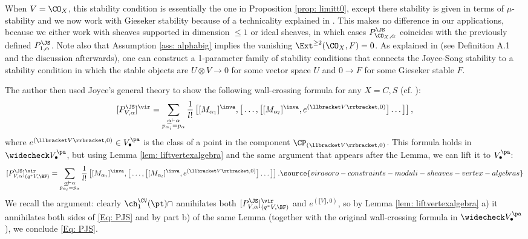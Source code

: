 When $V=\CO_X$, this stability condition is essentially the one in Proposition \ref{prop: limitt0}, except there stability is given in terms of $\mu$-stability and we now work with Gieseker stability because of a technicality explained in \cite[Rem. A.3]{Bo21.5}. This makes no difference in our applications, because we either work with sheaves supported in dimension $\leq 1$ or ideal sheaves, in which cases $P^{\JS}_{\CO_X, \alpha}$ coincides with the previously defined $P^{\JS}_{1,\alpha}$. Note also that Assumption \ref{ass: alphabig} implies the vanishing $\Ext^{\geq 2}(\CO_X,F)=0$. As explained in \cite{Bo21.5} (see Definition A.1 and the discussion afterwards), one can construct a 1-parameter family of stability conditions that connects the Joyce-Song stability to a stability condition in which the stable objects are $U\otimes V\to 0$ for some vector space $U$ and $0\to F$ for some Gieseker stable $F$.

The author then used Joyce's general theory to show the following wall-crossing formula for any $X=C,S$ (cf.  \cite[Theorem A.4]{Bo21.5}):
 $$[P^{\JS}_{V,\alpha}]^\vir= \sum_{\substack{\underline{\alpha} \vdash \alpha\\ p_{\alpha_i}=p_{\alpha}}}\frac{1}{l!}\, \big[[M_{\alpha_1}]^\inva, \big[\ldots, \big[[M_{\alpha_l}]^\inva, e^{(\llbracket V\rrbracket,0)}\big]\ldots\big]\big]\,,$$
 where $e^{(\llbracket V\rrbracket,0)}\in V_\bullet^{\pa}$ is the class of a point in the component $\CP_{(\llbracket V\rrbracket ,0)}$. This formula holds in $\widecheck V_\bullet^{\pa}$, but using Lemma \ref{lem: liftvertexalgebra} and the same argument that appears after the Lemma, we can lift it to $V_\bullet^{\pa}$:
\begin{equation}
\label{Eq: PJS} [P^{\JS}_{V,\alpha}]^\vir_{(q^*V,\BF)}= \sum_{\substack{\underline{\alpha} \vdash \alpha\\ p_{\alpha_i}=p_{\alpha}}}\frac{1}{l!}\, \big[[M_{\alpha_1}]^\inva, \big[\ldots, \big[[M_{\alpha_l}]^\inva, e^{(\llbracket V\rrbracket,0)}\big]\ldots\big]\big]\,.
\source{virasoro-constraints-moduli-sheaves-vertex-algebras}
\end{equation}
We recall the argument: clearly $\ch_1^{\CV}(\pt)\cap$ annihilates both  $[P^{\JS}_{V,\alpha}]^\vir_{(q^*V,\BF)}$ and $e^{(\llbracket V\rrbracket,0)}$, so by Lemma \ref{lem: liftvertexalgebra} a) it annihilates both sides of \eqref{Eq: PJS} and by part b) of the same Lemma (together with the original wall-crossing formula in $\widecheck V_\bullet^{\pa}$), we conclude \eqref{Eq: PJS}.

